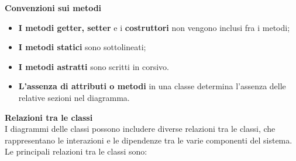 \textbf{Convenzioni sui metodi}
\begin{itemize}
	\item \textbf{I metodi getter, setter} e i \textbf{costruttori} non vengono inclusi fra i metodi;
	\item \textbf{I metodi statici} sono sottolineati;
	\item \textbf{I metodi astratti} sono scritti in corsivo.
	\item \textbf{L'assenza di attributi o metodi} in una classe determina l'assenza delle relative sezioni nel diagramma.
\end{itemize}
\textbf{Relazioni tra le classi}\\
I diagrammi delle classi possono includere diverse relazioni tra le classi, che rappresentano le interazioni e le dipendenze tra le varie componenti del sistema. Le principali relazioni tra le classi sono:
